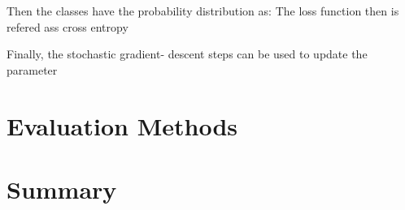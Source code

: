 Then the classes have the probability distribution as:
The loss function then is
refered ass cross entropy

Finally, the stochastic gradient- descent steps can be used to update the parameter

\section{Evaluation Methods}
\section{Summary}

